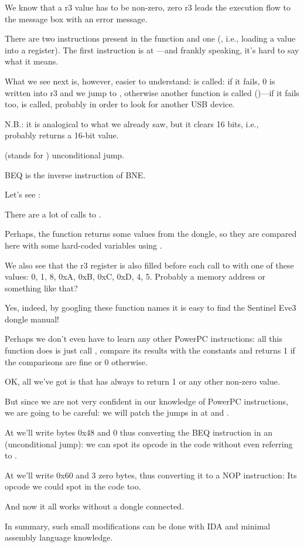 We know that a  r3 value has to be non-zero, zero r3 leads the execution
flow to the message box with an error message.

There are two  
instructions present in the function and one  
(, i.e., loading a value into a register).
The first instruction is at 
---and frankly speaking, it's hard to say what it means.

What we see next is, however, easier to understand: 
 is called:
if it fails, 0 is written into r3 and we jump to , otherwise another
function is called ()---if it fails too, 
is called, probably in order to look for another USB device.

N.B.:  it is analogical to what we already saw, but it clears
16 bits, i.e., \\
probably returns a 16-bit value.

 (stands for ) unconditional jump.

\ac{BEQ} is the inverse instruction of \ac{BNE}.

Let's see :



There are a lot of calls to . 

Perhaps, the function returns some values from the dongle,
so they are compared here with some hard-coded variables using .

We also see that the r3 register is also filled before each call to  
with one of these values: 0, 1, 8, 0xA, 0xB, 0xC, 0xD, 4, 5.
Probably a memory address or something like that?

Yes, indeed, by googling these function names it is easy to find the Sentinel Eve3 dongle manual!

Perhaps we don't even have to learn any other PowerPC instructions: all this function does is just
call , compare its results with the constants and returns 1 if the comparisons
are fine or 0 otherwise.

OK, all we've got is that  has always to return 1 or any other non-zero value.

But since we are not very confident in our knowledge of PowerPC instructions, we are going to be careful: we will patch the jumps in  at
 and .

At  we'll write bytes 0x48 and 0 thus converting the \ac{BEQ} instruction in an  (unconditional jump):
we can spot its opcode in the code without even referring to \PPC.

At  we'll write 0x60 and 3 zero bytes, thus converting it to a
\ac{NOP} instruction:
Its opcode we could spot in the code too.

And now it all works without a dongle connected.

In summary, such small modifications can be done with \ac{IDA} and minimal assembly language knowledge.

